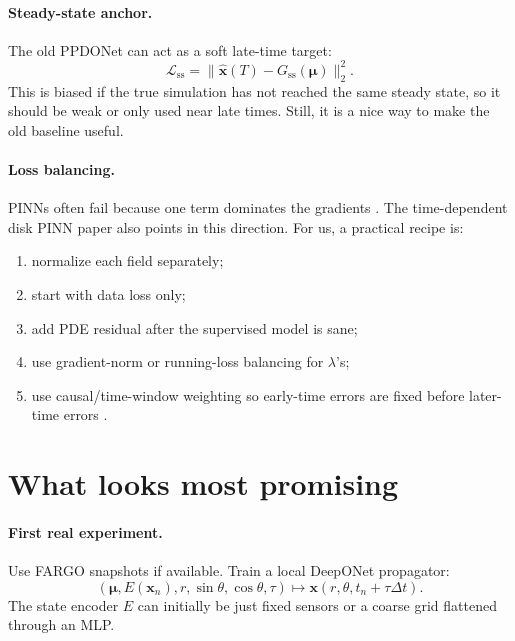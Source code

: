 \documentclass[11pt]{article}
\newcommand{\muvec}{\bm{\mu}}
\newcommand{\xfield}{\bm{x}}
\newcommand{\loss}{\mathcal{L}}
\begin{document}
\paragraph{Steady-state anchor.}
The old PPDONet can act as a soft late-time target:
\begin{equation}
    \loss_{\mathrm{ss}}
    =
    \|\hat{\xfield}(T)-G_{\mathrm{ss}}(\muvec)\|_2^2.
\end{equation}
This is biased if the true simulation has not reached the same steady state, so
it should be weak or only used near late times. Still, it is a nice way to make
the old baseline useful.

\paragraph{Loss balancing.}
PINNs often fail because one term dominates the gradients
\cite{wang2021pinnloss}. The time-dependent disk PINN paper also points in this
direction. For us, a practical recipe is:
\begin{enumerate}[leftmargin=*]
    \item normalize each field separately;
    \item start with data loss only;
    \item add PDE residual after the supervised model is sane;
    \item use gradient-norm or running-loss balancing for \(\lambda\)'s;
    \item use causal/time-window weighting so early-time errors are fixed before
    later-time errors \cite{wang2022causality}.
\end{enumerate}

\section{What looks most promising}

\paragraph{First real experiment.}
Use FARGO snapshots if available. Train a local DeepONet propagator:
\begin{equation}
    (\muvec, E(\xfield_n), r,\sin\theta,\cos\theta,\tau)
    \mapsto
    \xfield(r,\theta,t_n+\tau\Delta t).
\end{equation}
The state encoder \(E\) can initially be just fixed sensors or a coarse grid
flattened through an MLP.
\end{document}
